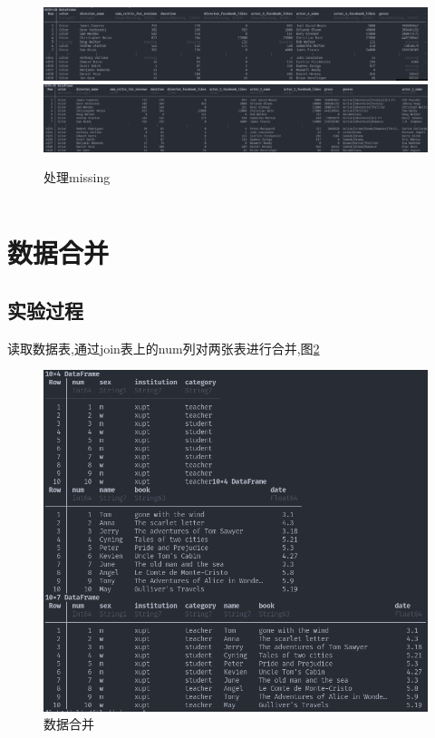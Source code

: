 \documentclass[a4paper]{article}
\begin{document}
\begin{figure}[h]
    \label{fig:missing}
    \centering
    \includegraphics[width=12cm]{去除导演missing的行.png}
    \includegraphics[width=12cm]{处理missing.png}
    \caption{处理missing}
\end{figure}

\begin{lstlisting}[language=julia]
\end{lstlisting}

\newpage

\section{数据合并}\label{sub:data_join}
\subsection{实验过程} \label{sub:data_join-lab}

读取数据表,通过join表上的num列对两张表进行合并,图\ref{fig:combine}

\begin{figure}[h]
    \centering
    \includegraphics[width=12cm]{images/合并.png}
    \caption{数据合并}
    \label{fig:combine}
\end{figure}
\end{document}
